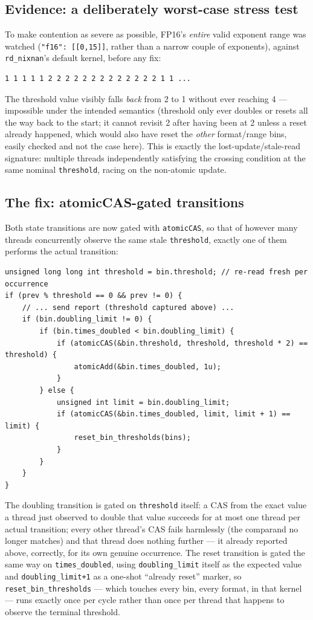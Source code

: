 \documentclass[11pt]{article}
\begin{document}
\subsection{Evidence: a deliberately worst-case stress test}

To make contention as severe as possible, FP16's \emph{entire} valid exponent range was
watched (\texttt{"f16": [[0,15]]}, rather than a narrow couple of exponents), against
\texttt{rd\_nixnan}'s default kernel, before any fix:
\begin{lstlisting}[basicstyle=\ttfamily\scriptsize]
1 1 1 1 1 2 2 2 2 2 2 2 2 2 2 2 2 2 1 1 ...
\end{lstlisting}
The threshold value visibly falls \emph{back} from 2 to 1 without ever reaching 4 ---
impossible under the intended semantics (threshold only ever doubles or resets all the
way back to the start; it cannot revisit 2 after having been at 2 unless a reset already
happened, which would also have reset the \emph{other} format/range bins, easily checked
and not the case here). This is exactly the lost-update/stale-read signature: multiple
threads independently satisfying the crossing condition at the same nominal
\texttt{threshold}, racing on the non-atomic update.

\subsection{The fix: atomicCAS-gated transitions}
\label{sec:cas-fix}

Both state transitions are now gated with \texttt{atomicCAS}, so that of however many
threads concurrently observe the same stale \texttt{threshold}, exactly one of them
performs the actual transition:
\begin{lstlisting}
unsigned long long int threshold = bin.threshold; // re-read fresh per occurrence
if (prev % threshold == 0 && prev != 0) {
    // ... send report (threshold captured above) ...
    if (bin.doubling_limit != 0) {
        if (bin.times_doubled < bin.doubling_limit) {
            if (atomicCAS(&bin.threshold, threshold, threshold * 2) == threshold) {
                atomicAdd(&bin.times_doubled, 1u);
            }
        } else {
            unsigned int limit = bin.doubling_limit;
            if (atomicCAS(&bin.times_doubled, limit, limit + 1) == limit) {
                reset_bin_thresholds(bins);
            }
        }
    }
}
\end{lstlisting}
The doubling transition is gated on \texttt{threshold} itself: a CAS from the exact value
a thread just observed to double that value succeeds for at most one thread per actual
transition; every other thread's CAS fails harmlessly (the comparand no longer matches)
and that thread does nothing further --- it already reported above, correctly, for its
own genuine occurrence. The reset transition is gated the same way on
\texttt{times\_doubled}, using \texttt{doubling\_limit} itself as the expected value and
\texttt{doubling\_limit+1} as a one-shot ``already reset'' marker, so
\texttt{reset\_bin\_thresholds} --- which touches every bin, every format, in that
kernel --- runs exactly once per cycle rather than once per thread that happens to
observe the terminal threshold.
\end{document}
